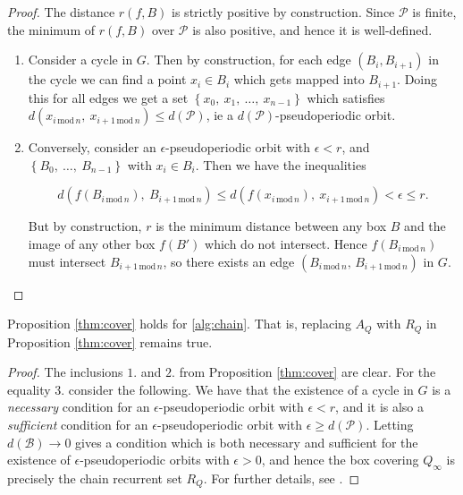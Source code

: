 \begin{proof}
    The distance $r(f, B)$ is strictly positive by construction. Since $\mathcal{P}$ is 
    finite, the minimum of $r(f, B)$ over $\mathcal{P}$ is also positive, and hence 
    it is well-defined. 

    \begin{enumerate}
        \item Consider a cycle in $G$. Then by construction, for each edge $(B_i, B_{i+1})$ 
        in the cycle we can find a point $x_i \in B_i$ which gets mapped into $B_{i+1}$. 
        Doing this for all edges we get a set $\left\{ x_0,\ x_1,\ \ldots,\ x_{n-1} \right\}$ 
        which satisfies $d(x_{i\, \text{mod}\, n},\ x_{i+1\, \text{mod}\, n}) \leq d(\mathcal{P})$, 
        ie a $d(\mathcal{P})$-pseudoperiodic orbit. 
        \item Conversely, consider an $\epsilon$-pseudoperiodic orbit with $\epsilon < r$, 
        and $\left\{ B_0,\ \ldots,\ B_{n-1} \right\}$ with $x_i \in B_i$. 
        Then we have the inequalities 

        \begin{equation}
            d(f(B_{i\, \text{mod}\, n}),\ B_{i+1\, \text{mod}\, n}) \leq
            d(f(x_{i\, \text{mod}\, n}),\ x_{i+1\, \text{mod}\, n}) <
            \epsilon \leq r.
        \end{equation}

        But by construction, $r$ is the minimum distance between any box $B$ and the image 
        of any other box $f(B')$ which do not intersect. Hence 
        $f(B_{i\, \text{mod}\, n})$ must intersect $B_{i+1\, \text{mod}\, n}$, so there 
        exists an edge $(B_{i\, \text{mod}\, n},\, B_{i+1\, \text{mod}\, n})$ in $G$. 
    \end{enumerate}
\end{proof}

\begin{corollary}
    Proposition \ref{thm:cover} holds for \autoref{alg:chain}. That is, replacing $A_Q$ 
    with $R_Q$ in Proposition \ref{thm:cover} remains true. 
\end{corollary}

\begin{proof}
    The inclusions $1.$ and $2.$ from Proposition \ref{thm:cover} are clear. For the 
    equality $3.$ consider the following. 
    We have that the existence of a cycle in $G$ is a \emph{necessary} condition for an
    $\epsilon$-pseudoperiodic orbit with $\epsilon < r$, and it is also a 
    \emph{sufficient} condition for an $\epsilon$-pseudoperiodic orbit with 
    $\epsilon \geq d(\mathcal{P})$. Letting $d(\mathcal{B}) \to 0$ gives a condition which 
    is both necessary and sufficient for the existence of $\epsilon$-pseudoperiodic orbits 
    with $\epsilon > 0$, and hence the box covering $Q_\infty$ is precisely the chain 
    recurrent set $R_Q$. For further details, see \cite*{chain}. 
\end{proof}

